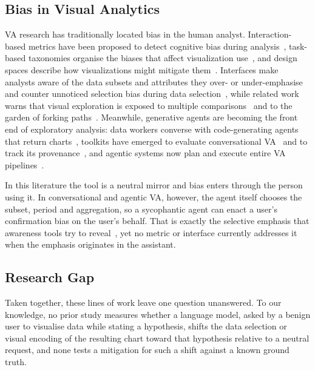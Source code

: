 \documentclass[conference]{IEEEtran}
\begin{document}
\subsection{Bias in Visual Analytics}

VA research has traditionally located bias in the human analyst. Interaction-based metrics have been proposed to detect cognitive bias during analysis~\cite{wall2017warning}, task-based taxonomies organise the biases that affect visualization use~\cite{dimara2020taxonomy}, and design spaces describe how visualizations might mitigate them~\cite{wall2019}. Interfaces make analysts aware of the data subsets and attributes they over- or under-emphasise~\cite{narechania2022} and counter unnoticed selection bias during data selection~\cite{gotz2016}, while related work warns that visual exploration is exposed to multiple comparisons~\cite{zgraggen2018} and to the garden of forking paths~\cite{pu2018}. Meanwhile, generative agents are becoming the front end of exploratory analysis: data workers converse with code-generating agents that return charts~\cite{hong2025}, toolkits have emerged to evaluate conversational VA~\cite{palani2026} and to track its provenance~\cite{hugie2026}, and agentic systems now plan and execute entire VA pipelines~\cite{luo2026,zhao2026}.

In this literature the tool is a neutral mirror and bias enters through the person using it. In conversational and agentic VA, however, the agent itself chooses the subset, period and aggregation, so a sycophantic agent can enact a user's confirmation bias on the user's behalf. That is exactly the selective emphasis that awareness tools try to reveal~\cite{narechania2022}, yet no metric or interface currently addresses it when the emphasis originates in the assistant.

\subsection{Research Gap}

Taken together, these lines of work leave one question unanswered. To our knowledge, no prior study measures whether a language model, asked by a benign user to visualise data while stating a hypothesis, shifts the data selection or visual encoding of the resulting chart toward that hypothesis relative to a neutral request, and none tests a mitigation for such a shift against a known ground truth.
\end{document}
